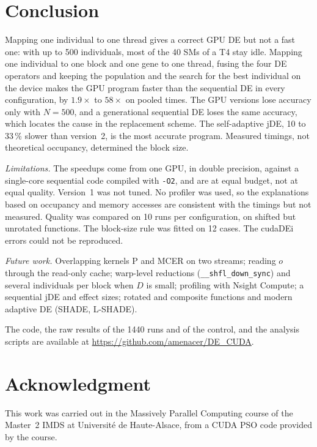 \documentclass[conference]{IEEEtran}
\begin{document}
\FloatBarrier
\section{Conclusion}\label{sec:conc}
Mapping one individual to one thread gives a correct GPU DE but not a fast one: with up to 500
individuals, most of the 40 SMs of a T4 stay idle. Mapping one individual to one block and one
gene to one thread, fusing the four DE operators and keeping the population and the search for
the best individual on the device makes the GPU program faster than the sequential DE in every
configuration, by $1.9\times$ to $58\times$ on pooled times. The GPU versions lose accuracy only
with $N=500$, and a generational sequential DE loses the same accuracy, which locates the cause
in the replacement scheme. The self-adaptive jDE, 10 to 33\,\% slower than version~2, is the most
accurate program. Measured timings, not theoretical occupancy, determined the block size.

\emph{Limitations.} The speedups come from one GPU, in double precision, against a single-core
sequential code compiled with \texttt{-O2}, and are at equal budget, not at equal quality.
Version~1 was not tuned. No profiler was used, so the explanations based on occupancy and memory
accesses are consistent with the timings but not measured. Quality was compared on 10 runs per
configuration, on shifted but unrotated functions. The block-size rule was fitted on 12 cases.
The cudaDEi errors could not be reproduced.

\emph{Future work.} Overlapping kernels P and MCER on two streams; reading $o$ through the
read-only cache; warp-level reductions (\texttt{\_\_shfl\_down\_sync}) and several individuals per
block when $D$ is small; profiling with Nsight Compute; a sequential jDE and effect sizes;
rotated and composite functions and modern adaptive DE (SHADE, L-SHADE).

The code, the raw results of the 1440 runs and of the control, and the analysis scripts are
available at \url{https://github.com/amenacer/DE_CUDA}.

\section*{Acknowledgment}
This work was carried out in the Massively Parallel Computing course of the Master~2 IMDS at
Universit\'e de Haute-Alsace, from a CUDA PSO code provided by the course.
\end{document}
